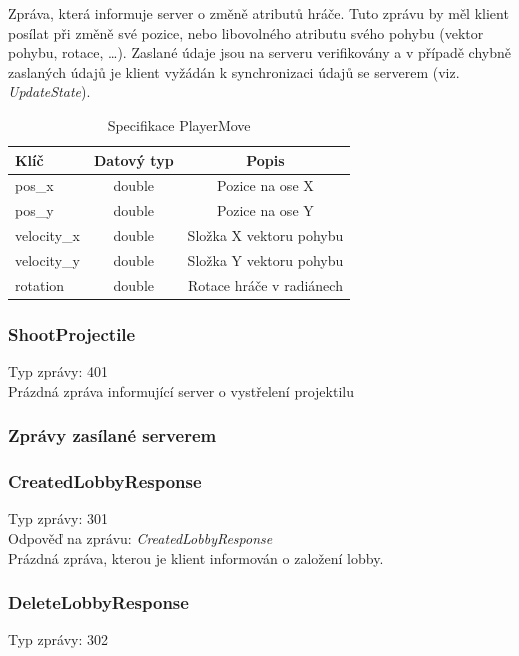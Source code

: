 \documentclass[12pt, a4paper]{article}
\begin{document}
    Zpráva, která informuje server o změně atributů hráče.
    Tuto zprávu by měl klient posílat při změně své pozice, nebo libovolného atributu svého pohybu (vektor pohybu, rotace, \dots).
    Zaslané údaje jsou na serveru verifikovány a v případě chybně zaslaných údajů je klient vyžádán k synchronizaci údajů se serverem (viz. \textit{UpdateState}).

    \begin{table}[H]
        \centering
        \begin{tabular}{|l|c|c|}
            \hline
            Klíč & Datový typ & Popis\\
            \hline
            \hline
            pos\_x & double & Pozice na ose X\\
            \hline
            pos\_y & double & Pozice na ose Y\\
            \hline
            velocity\_x & double & Složka X vektoru pohybu\\
            \hline
            velocity\_y & double & Složka Y vektoru pohybu\\
            \hline
            rotation & double & Rotace hráče v radiánech\\
            \hline
        \end{tabular}
        \caption{Specifikace PlayerMove}
    \end{table}

    \subsubsection*{ShootProjectile}
    Typ zprávy: 401\\

    Prázdná zpráva informující server o vystřelení projektilu

    \subsubsection{Zprávy zasílané serverem}
    \subsubsection*{CreatedLobbyResponse}
    Typ zprávy: 301\\
    Odpověď na zprávu: \textit{CreatedLobbyResponse}\\

    Prázdná zpráva, kterou je klient informován o založení lobby.

    \subsubsection*{DeleteLobbyResponse}
    Typ zprávy: 302\\
\end{document}
